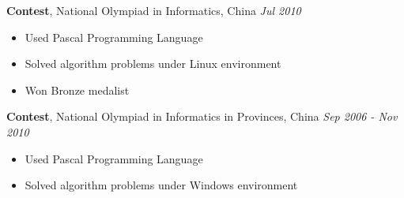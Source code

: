 \documentclass[a4paper, 12pt]{article}
\newenvironment{changemargin}[2]{%
  \begin{list}{}{%
      \setlength{\topsep}{0pt}%
      \setlength{\leftmargin}{#1}%
      \setlength{\rightmargin}{#2}%
      \setlength{\listparindent}{\parindent}%
      \setlength{\itemindent}{\parindent}%
      \setlength{\parsep}{\parskip}%
    }%
  \item[]}{\end{list}
}
\newenvironment{body}
{
\vspace*{-16pt}
\begin{changemargin}{-0.25in}{-0.5in}
}	
{
\end{changemargin}
}
\begin{document}
\begin{body}
  \textbf {Contest}, {National Olympiad in Informatics, China} \hfill \emph{Jul 2010}\\
  \vspace*{-4pt}
  \begin{itemize} \itemsep -0pt \small
  \item Used Pascal Programming Language
  \item Solved algorithm problems under Linux environment
  \item Won Bronze medalist
  \end{itemize}

  \textbf {Contest}, {National Olympiad in Informatics in Provinces, China} \hfill \emph{Sep 2006 - Nov 2010}\\
  \vspace*{-4pt}
  \begin{itemize} \itemsep -0pt \small
  \item Used Pascal Programming Language
  \item Solved algorithm problems under Windows environment
  \end{itemize}
\end{body}
\end{document}
